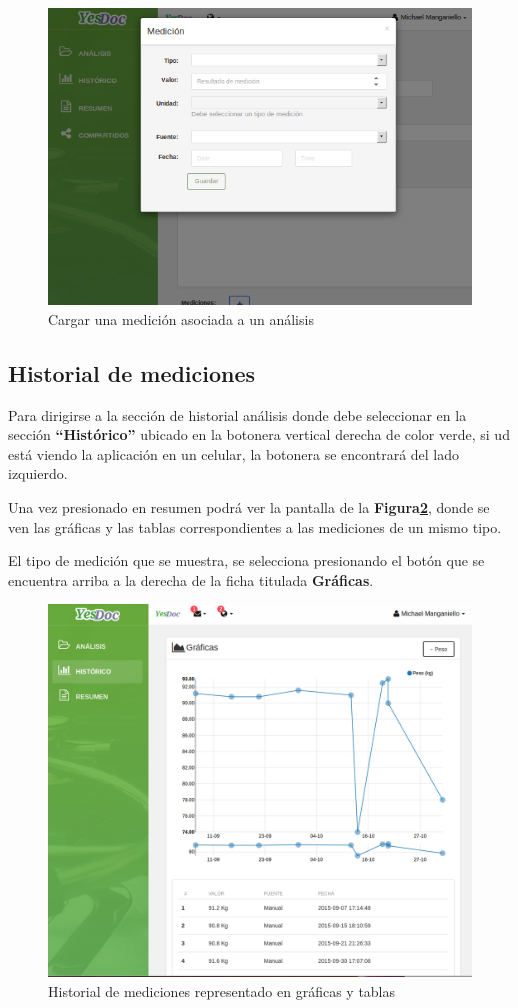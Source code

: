  	\begin{figure}
 		\centering
 		\includegraphics[width=.8\textwidth]{img/manual_de_usuario/mu-cargar_medicion}
 		\caption{Cargar una medición asociada a un análisis}
 		\label{mu-cargar_medicion}	
 	\end{figure}

\subsection{Historial de mediciones}
Para dirigirse a la sección de historial análisis donde debe seleccionar en la sección \textbf{``Histórico''} ubicado en la botonera vertical derecha de color verde, si ud está viendo la aplicación en un celular, la botonera se encontrará del lado izquierdo.

Una vez presionado en resumen podrá ver la pantalla de la \textbf{Figura\ref{mu-historico}}, donde se ven las gráficas y las tablas correspondientes a las mediciones de un mismo tipo.

El tipo de medición que se muestra, se selecciona presionando el botón que se encuentra arriba a la derecha de la ficha titulada \textbf{Gráficas}.

\begin{figure}
	\centering
	\includegraphics[width=.8\textwidth]{img/manual_de_usuario/historico}
	\caption{Historial de mediciones representado en gráficas y tablas}
	\label{mu-historico}
\end{figure}

